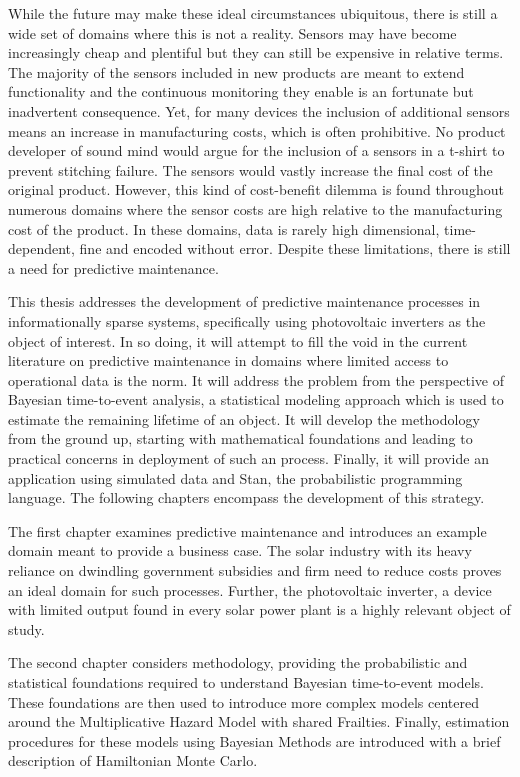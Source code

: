 While the future may make these ideal circumstances ubiquitous, there is still a wide set of domains where this is not a reality. Sensors may have become increasingly cheap and plentiful but they can still be expensive in relative terms. The majority of the sensors included in new products are meant to extend functionality and the continuous monitoring they enable is an fortunate but inadvertent consequence. Yet, for many devices the inclusion of additional sensors means an increase in manufacturing costs, which is often prohibitive. No product developer of sound mind would argue for the inclusion of a sensors in a t-shirt to prevent stitching failure. The sensors would vastly increase the final cost of the original product. However, this kind of cost-benefit dilemma is found throughout numerous domains where the sensor costs are high relative to the manufacturing cost of the product. In these domains, data is rarely high dimensional, time-dependent, fine and encoded without error. Despite these limitations, there is still a need for predictive maintenance. 

This thesis addresses the development of predictive maintenance processes in informationally sparse systems, specifically using photovoltaic inverters as the object of interest. In so doing, it will attempt to fill the void in the current literature on predictive maintenance in domains where limited access to operational data is the norm. It will address the problem from the perspective of Bayesian time-to-event analysis, a statistical modeling approach which is used to estimate the remaining lifetime of an object. It will develop the methodology from the ground up, starting with mathematical foundations and leading to practical concerns in deployment of such an process. Finally, it will provide an application using simulated data and Stan, the probabilistic programming language. The following chapters encompass the development of this strategy. 

The first chapter examines predictive maintenance and introduces an example domain meant to provide a business case. The solar industry with its heavy reliance on dwindling government subsidies and firm need to reduce costs proves an ideal domain for such processes. Further, the photovoltaic inverter, a device with limited output found in every solar power plant is a highly relevant object of study. 

The second chapter considers methodology, providing the probabilistic and statistical foundations required to understand Bayesian time-to-event models. These foundations are then used to introduce more complex models centered around the Multiplicative Hazard Model with shared Frailties. Finally, estimation procedures for these models using Bayesian Methods are introduced with a brief description of Hamiltonian Monte Carlo. 


